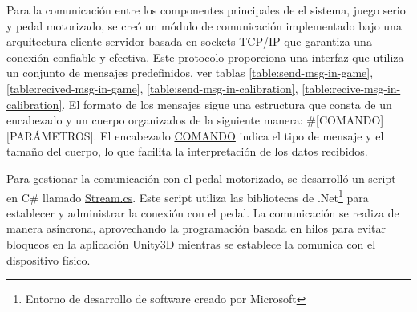 Para la comunicación entre los componentes principales de el sistema, juego serio y pedal motorizado, se creó un módulo de comunicación implementado bajo una arquitectura cliente-servidor basada en sockets TCP/IP que garantiza una conexión confiable y efectiva. Este protocolo proporciona una interfaz que utiliza un conjunto de mensajes predefinidos, ver tablas \ref{table:send-msg-in-game}, \ref{table:recived-msg-in-game}, \ref{table:send-msg-in-calibration}, \ref{table:recive-msg-in-calibration}. El formato de los mensajes sigue una estructura que consta de un encabezado y un cuerpo organizados de la siguiente manera: \#[COMANDO][PARÁMETROS]. El encabezado \underline{COMANDO} indica el tipo de mensaje y el tamaño del cuerpo, lo que facilita la interpretación de los datos recibidos.

Para gestionar la comunicación con el pedal motorizado, se desarrolló un script en C\# llamado \underline{Stream.cs}. Este script utiliza las bibliotecas de .Net\footnote{Entorno de desarrollo de software creado por Microsoft} para establecer y administrar la conexión con el pedal. La comunicación se realiza de manera asíncrona, aprovechando la programación basada en hilos para evitar bloqueos en la aplicación Unity3D mientras se establece la comunica con el dispositivo físico.

